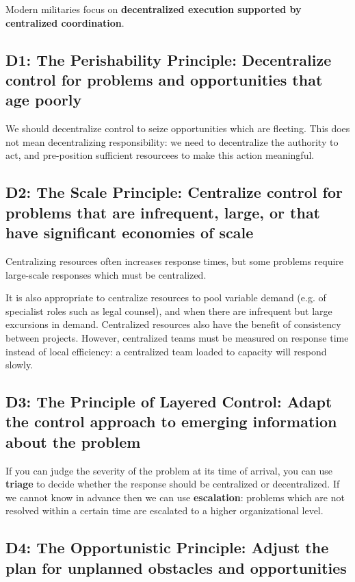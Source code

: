\documentclass{article}
\begin{document}
\begin{multicols}{2}

\noindent
Modern militaries focus on \textbf{decentralized execution supported by centralized coordination}.

\subsection{D1: The Perishability Principle: Decentralize control for problems and opportunities that age poorly}

We should decentralize control to seize opportunities which are fleeting. This does not mean decentralizing responsibility: we need to decentralize the authority to act, and pre-position sufficient resourcees to make this action meaningful.

\subsection{D2: The Scale Principle: Centralize control for problems that are infrequent, large, or that have significant economies of scale}

Centralizing resources often increases response times, but some problems require large-scale responses which must be centralized.

It is also appropriate to centralize resources to pool variable demand (e.g. of specialist roles such as legal counsel), and when there are infrequent but large excursions in demand. Centralized resources also have the benefit of consistency between projects. However, centralized teams must be measured on response time instead of local efficiency: a centralized team loaded to capacity will respond slowly.

\subsection{D3: The Principle of Layered Control: Adapt the control approach to emerging information about the problem}

If you can judge the severity of the problem at its time of arrival, you can use \textbf{triage} to decide whether the response should be centralized or decentralized. If we cannot know in advance then we can use \textbf{escalation}: problems which are not resolved within a certain time are escalated to a higher organizational level.

\subsection{D4: The Opportunistic Principle: Adjust the plan for unplanned obstacles and opportunities}


\end{multicols}
\end{document}
